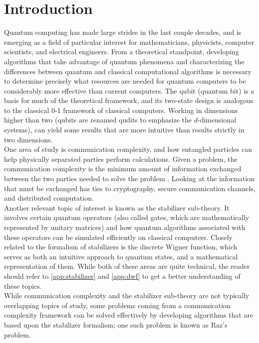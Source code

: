 \documentclass[../3Wworkreport.tex]{subfiles}
\begin{document}
\chapter{Introduction}
\label{chap:intro}

Quantum computing has made large strides in the last couple decades, and is emerging as a field of particular interest for mathematicians, physicists, computer scientists, and electrical engineers. From a theoretical standpoint, developing algorithms that take advantage of quantum phenomena and characterizing the differences between quantum and classical computational algorithms is necessary to determine precisely what resources are needed for quantum computers to be considerably more effective than current computers. The qubit (quantum bit) is a basis for much of the theoretical framework, and its two-state design is analogous to the classical 0-1 framework of classical computers. Working in dimensions higher than two (qubits are renamed qudits to emphasize the $d$-dimensional systems), can yield some results that are more intuitive than results strictly in two dimensions.\\

One area of study is communication complexity, and how entangled particles can help physically separated parties perform calculations. Given a problem, the communication complexity is the minimum amount of information exchanged between the two parties needed to solve the problem \cite{kushilevitz2006}. Looking at the information that must be exchanged has ties to cryptography, secure communication channels, and distributed computation.\\

Another relevant topic of interest is known as the stabilizer sub-theory. It involves certain quantum operators (also called gates, which are mathematically represented by unitary matrices) and how quantum algorithms associated with these operators can be simulated efficiently on classical computers. Closely related to the formalism of stabilizers is the discrete Wigner function, which serves as both an intuitive approach to quantum states, and a mathematical representation of them. While both of these areas are quite technical, the reader should refer to \autoref{app:stabilizer} and \autoref{app:dwf} to get a better understanding of these topics.\\

While communication complexity and the stabilizer sub-theory are not typically overlapping topics of study, some problems coming from a communication complexity framework can be solved effectively by developing algorithms that are based upon the stabilizer formalism; one such problem is known as Raz's problem.\\
\end{document}
